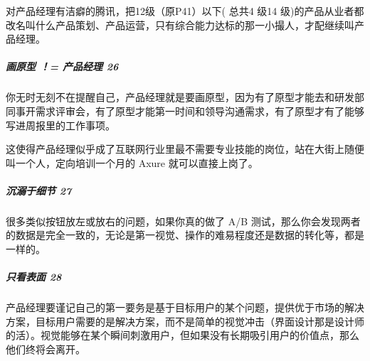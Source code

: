 \documentclass[letterpaper,11pt,english]{sphinxmanual}
\begin{document}
对产品经理有洁癖的腾讯，把12级（原P4\sphinxhyphen{}1）以下( 总共4 级\sphinxhyphen{}14
级)的产品从业者都改名叫什么产品策划、产品运营，只有综合能力达标的那一小撮人，才配继续叫产品经理。%
\begin{footnote}[133]\sphinxAtStartFootnote
{}
%
\end{footnote}

\begin{center}\end{center} 


\subparagraph{画原型 ！= 产品经理 26\sphinxfootnotemark[134]}
\label{\detokenize{chapter_introduction/PM:id9}}%
\begin{footnotetext}[134]\sphinxAtStartFootnote
{}
%
\end{footnotetext}\ignorespaces 
你无时无刻不在提醒自己，产品经理就是要画原型，因为有了原型才能去和研发部同事开需求评审会，有了原型才能第一时间和领导沟通需求，有了原型才有了能够写进周报里的工作事项。

这使得产品经理似乎成了互联网行业里最不需要专业技能的岗位，站在大街上随便叫一个人，定向培训一个月的
Axure 就可以直接上岗了。


\subparagraph{沉溺于细节 27\sphinxfootnotemark[135]}
\label{\detokenize{chapter_introduction/PM:id10}}%
\begin{footnotetext}[135]\sphinxAtStartFootnote
{}
%
\end{footnotetext}\ignorespaces 
很多类似按钮放左或放右的问题，如果你真的做了 A/B
测试，那么你会发现两者的数据是完全一致的，无论是第一视觉、操作的难易程度还是数据的转化等，都是一样的。


\subparagraph{只看表面 28\sphinxfootnotemark[136]}
\label{\detokenize{chapter_introduction/PM:id11}}%
\begin{footnotetext}[136]\sphinxAtStartFootnote
{}
%
\end{footnotetext}\ignorespaces 
产品经理要谨记自己的第一要务是基于目标用户的某个问题，提供优于市场的解决方案，目标用户需要的是解决方案，而不是简单的视觉冲击（界面设计那是设计师的活）。视觉能够在某个瞬间刺激用户，但如果没有长期吸引用户的价值点，那么他们终将会离开。
\end{document}
